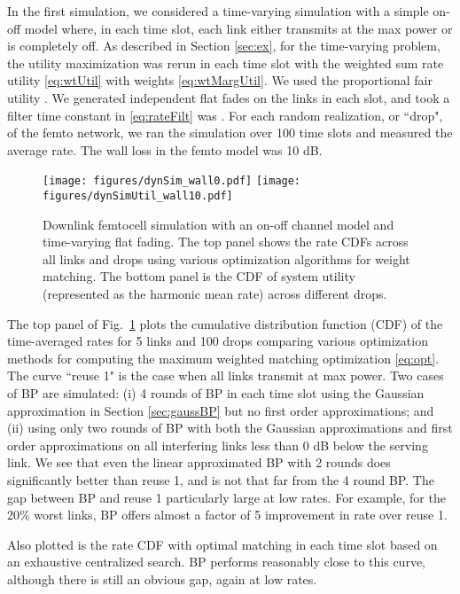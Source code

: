 \documentclass[letterpaper,twocolumn,twoside]{IEEEtran}
\begin{document}
In the first simulation, we considered a time-varying simulation
with a simple on-off model where, in each time slot,
each link either transmits at the max power or is completely off.
As described in Section \ref{sec:ex}, for the time-varying problem,
the utility maximization was rerun in each
time slot with the weighted sum rate utility \eqref{eq:wtUtil} with weights
\eqref{eq:wtMargUtil}.  We used the proportional fair utility .
We generated independent flat fades on the links in each slot,
and took a filter time constant in \eqref{eq:rateFilt} was .
For each random realization, or ``drop", of the femto network, we ran the simulation
over 100 time slots and measured the average rate.
The wall loss in the femto model was 10 dB.


\begin{figure}
\begin{center}
\texttt{[image: figures/dynSim\_wall0.pdf]}
  \texttt{[image: figures/dynSimUtil\_wall10.pdf]}
\end{center}
\caption{Downlink femtocell simulation with an on-off channel model
and time-varying flat fading.
The top panel shows the rate CDFs across all links and drops
using various optimization algorithms for weight matching.
The bottom panel is the CDF of system utility (represented
as the harmonic mean rate) across different drops.}
\label{fig:dynSim}
\end{figure}

The top panel of Fig.\ \ref{fig:dynSim} plots
the cumulative distribution function (CDF)
of the time-averaged rates for 5 links and 100 drops
comparing various optimization methods for computing the maximum weighted
matching optimization \eqref{eq:opt}.
The curve ``reuse 1" is the case when all links transmit at max power.
Two cases of BP
are simulated:  (i) 4 rounds of BP in each time slot
using the Gaussian approximation in Section
\ref{sec:gaussBP} but no first order approximations; and
(ii) using only two rounds of BP
with both the Gaussian approximations and first order approximations on all interfering links less than 0 dB below the serving link.
We see that even the linear approximated BP with 2 rounds does significantly better
than reuse 1, and is not that far from the 4 round BP.
The gap between BP and reuse 1 particularly large at low rates.
For example, for the 20\% worst links,
BP offers almost a factor of 5 improvement in rate over reuse 1.

Also plotted is the rate CDF with optimal matching in each time slot
based on an exhaustive centralized search.
BP performs reasonably close to this curve, although there is still an
obvious gap, again at low rates.
\end{document}
